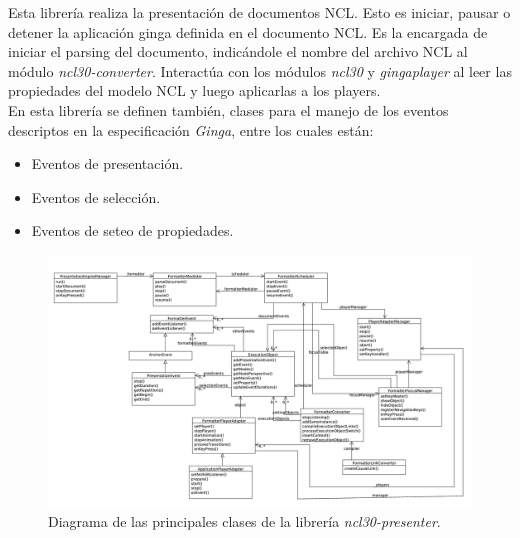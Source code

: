 Esta librería realiza la presentación de documentos NCL. Esto es iniciar, pausar o detener la aplicación ginga definida en el documento NCL.
Es la encargada de iniciar el parsing del documento, indicándole el nombre del archivo NCL al módulo \emph{ncl30-converter}.
Interactúa con los módulos \emph{ncl30} y \emph{gingaplayer} al leer las propiedades del modelo NCL y luego aplicarlas a los players.\\
En esta librería se definen también, clases para el manejo de los eventos descriptos en la especificación \emph{Ginga}, entre los cuales están:
\begin{itemize}[noitemsep,nolistsep]
\item Eventos de presentación.
\item Eventos de selección.
\item Eventos de seteo de propiedades.
\end{itemize}

\begin{figure}[h!]
	\centering
	\includegraphics[scale=0.35]{resources/uml-ncl30-presenter.jpg}
	\caption{Diagrama de las principales clases de la librería \emph{ncl30-presenter}.}
\end{figure}

\FloatBarrier
